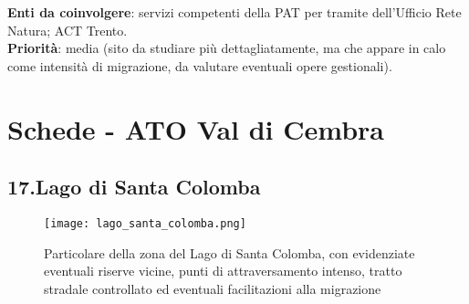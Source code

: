 \documentclass[11pt,a4paper,twoside]{memoir}
\begin{document}
\textbf{Enti da coinvolgere}: servizi competenti della PAT per tramite dell’Ufficio Rete Natura; ACT Trento. \\
\textbf{Priorità}: media (sito da studiare più dettagliatamente, ma che appare in calo come intensità di migrazione, da valutare eventuali opere gestionali). \\

\newpage
\section{Schede - ATO Val di Cembra}
\begin{tcolorbox}[breakable,colback=white,colframe=green,width=10cm]
\subsection{17.Lago di Santa Colomba}
\end{tcolorbox}

\begin{figure}[H]
\label{fig:map_colomba}
\centering
  \texttt{[image: lago\_santa\_colomba.png]}
\caption{Particolare della zona del Lago di Santa Colomba, con evidenziate eventuali riserve vicine, punti di attraversamento intenso, tratto stradale controllato ed eventuali facilitazioni alla migrazione}
\end{figure}
\end{document}
